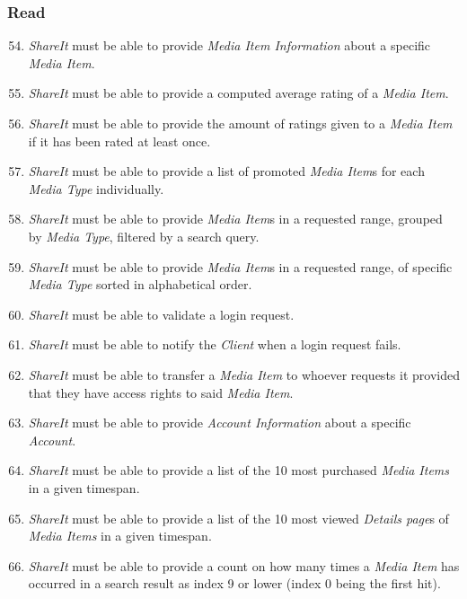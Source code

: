 \documentclass[../report.tex]{subfiles}
\begin{document}
\label{sec:Functional Requirements Server}

\noindent

\subsubsection{Read}
\begin{enumerate}[label=\textbf{FR-\twodigits*}]

\setcounter{enumi}{53}

\item \textit{ShareIt} must be able to provide \textit{Media Item Information} about a specific \textit{Media Item}.

\item \textit{ShareIt} must be able to provide a computed average rating of a \textit{Media Item}.

\item \textit{ShareIt} must be able to provide the amount of ratings given to a \textit{Media Item} if it has been rated at least once.

\item \textit{ShareIt} must be able to provide a list of promoted \textit{Media Item}s for each \textit{Media Type} individually.

\item \textit{ShareIt} must be able to provide \textit{Media Item}s in a requested range, grouped by \textit{Media Type}, filtered by a search query.

\item \textit{ShareIt} must be able to provide \textit{Media Item}s in a requested range, of specific \textit{Media Type} sorted in alphabetical order.

\item \textit{ShareIt} must be able to validate a login request.

\item \textit{ShareIt} must be able to notify the \textit{Client} when a login request fails.

\item \textit{ShareIt} must be able to transfer a \textit{Media Item} to whoever requests it provided that they have access rights to said \textit{Media Item}.

\item \textit{ShareIt} must be able to provide \textit{Account Information} about a specific \textit{Account}.

\item \textit{ShareIt} must be able to provide a list of the 10 most purchased \textit{Media Items} in a given timespan.

\item \textit{ShareIt} must be able to provide a list of the 10 most viewed \textit{Details page}s of \textit{Media Items} in a given timespan.

\item \textit{ShareIt} must be able to provide a count on how many times a \textit{Media Item} has occurred in a search result as index 9 or lower (index 0 being the first hit). 

\end{enumerate}
\end{document}
